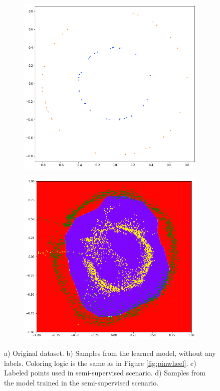\begin{figure}
  \begin{subfigure}[t]{.24\textwidth}
    \centering
    \includegraphics[width=0.9\linewidth]{figures/labeled_2_circles.png}
  \end{subfigure}%
  \begin{subfigure}[t]{.24\textwidth}
    \centering
    \includegraphics[width=0.9\linewidth]{figures/trained_2_circles_semisup.png}
  \end{subfigure}
  \caption{\scriptsize a) Original dataset. b) Samples from the learned model, without any labels. Coloring logic
    is the same as in Figure \ref{fig:pinwheel}. c) Labeled points used in semi-supervised scenario.
    d) Samples from the model trained in the semi-supervised scenario.}
  \label{fig:twocircles}
\end{figure}

